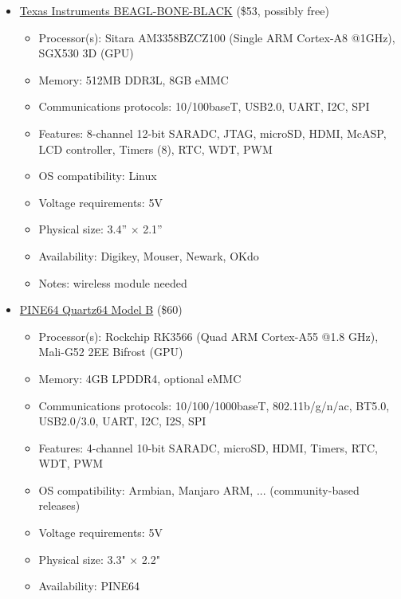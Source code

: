 \begin{itemize}
    \item
    \href{https://www.ti.com/tool/BEAGL-BONE-BLACK}{Texas Instruments BEAGL-BONE-BLACK} (\$53,
    possibly free)
    \begin{itemize}
        \item Processor(s): Sitara AM3358BZCZ100 (Single ARM Cortex-A8 @1GHz), SGX530 3D (GPU)
        \item Memory: 512MB DDR3L, 8GB eMMC
        \item Communications protocols: 10/100baseT, USB2.0, UART, I2C, SPI
        \item Features: 8-channel 12-bit SARADC, JTAG, microSD, HDMI, McASP, LCD controller, Timers
        (8), RTC, WDT, PWM
        \item OS compatibility: Linux
        \item Voltage requirements: 5V
        \item Physical size: 3.4” $\times$ 2.1”
        \item Availability: Digikey, Mouser, Newark, OKdo 
        \item Notes: wireless module needed
    \end{itemize}

    \item
    \href{https://www.pine64.org/quartz64b/}{PINE64 Quartz64 Model B} (\$60)
    \begin{itemize}
        \item Processor(s): Rockchip RK3566 (Quad ARM Cortex-A55 @1.8 GHz), Mali-G52 2EE Bifrost
        (GPU)
        \item Memory: 4GB LPDDR4, optional eMMC
        \item Communications protocols: 10/100/1000baseT, 802.11b/g/n/ac, BT5.0, USB2.0/3.0,
        UART, I2C, I2S, SPI
        \item Features: 4-channel 10-bit SARADC, microSD, HDMI, Timers, RTC, WDT, PWM
        \item OS compatibility: Armbian, Manjaro ARM, ... (community-based releases)
        \item Voltage requirements: 5V
        \item Physical size: 3.3" $\times$ 2.2"
        \item Availability: PINE64
    \end{itemize}


\end{itemize}
